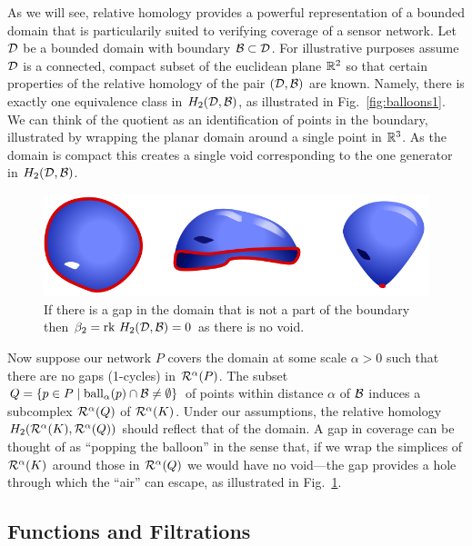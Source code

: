 As we will see, relative homology provides a powerful representation of a bounded domain that is particularily suited to verifying coverage of a sensor network.
Let ${\mathcal{D}}$ be a bounded domain with boundary ${\mathcal{B}}\subset{\mathcal{D}}$.
For illustrative purposes assume ${\mathcal{D}}$ is a connected, compact subset of the euclidean plane $\mathbb{R}^2$ so that certain properties of the relative homology of the pair $({\mathcal{D}}, {\mathcal{B}})$ are known.
Namely, there is exactly one equivalence class in $H_2({\mathcal{D}}, {\mathcal{B}})$, as illustrated in Fig.~\ref{fig:balloons1}.
We can think of the quotient as an identification of points in the boundary, illustrated by wrapping the planar domain around a single point in $\mathbb{R}^3$.
As the domain is compact this creates a single void corresponding to the one generator in $H_2({\mathcal{D}}, {\mathcal{B}})$.

\begin{figure}[htbp]
\centering
    \includegraphics[scale=0.5]{figures/balloons2.png}
    \caption{If there is a gap in the domain that is not a part of the boundary then $\beta_2 = \mathrm{rk}~ H_2({\mathcal{D}}, {\mathcal{B}}) = 0$ as there is no void.}
    \label{fig:balloons2}
\end{figure}

Now suppose our network $P$ covers the domain at some scale $\alpha > 0$ such that there are no gaps (1-cycles) in $\mathcal{R}^\alpha(P)$.
The subset $Q = \{p\in P\mid \mathrm{ball}_\alpha(p)\cap{\mathcal{B}}\neq\emptyset\}$ of points within distance $\alpha$ of ${\mathcal{B}}$ induces a subcomplex $\mathcal{R}^\alpha(Q)$ of $\mathcal{R}^\alpha(K)$.
Under our assumptions, the relative homology $H_2(\mathcal{R}^\alpha(K), \mathcal{R}^\alpha(Q))$ should reflect that of the domain.
A gap in coverage can be thought of as ``popping the balloon'' in the sense that, if we wrap the simplices of $\mathcal{R}^\alpha(K)$ around those in $\mathcal{R}^\alpha(Q)$ we would have no void---the gap provides a hole through which the ``air'' can escape, as illustrated in Fig.~\ref{fig:balloons2}.

\subsection{Functions and Filtrations}

